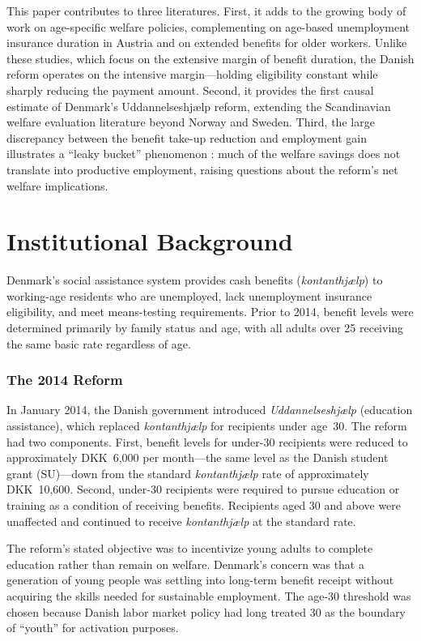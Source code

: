 \documentclass[12pt]{article}
\begin{document}
This paper contributes to three literatures. First, it adds to the growing body of work on age-specific welfare policies, complementing \citet{card2007a} on age-based unemployment insurance duration in Austria and \citet{lalive2006} on extended benefits for older workers. Unlike these studies, which focus on the extensive margin of benefit duration, the Danish reform operates on the intensive margin---holding eligibility constant while sharply reducing the payment amount. Second, it provides the first causal estimate of Denmark's Uddannelseshjælp reform, extending the Scandinavian welfare evaluation literature beyond Norway and Sweden. Third, the large discrepancy between the benefit take-up reduction and employment gain illustrates a ``leaky bucket'' phenomenon \citep{okun1975}: much of the welfare savings does not translate into productive employment, raising questions about the reform's net welfare implications.

\section{Institutional Background}

Denmark's social assistance system provides cash benefits (\textit{kontanthjælp}) to working-age residents who are unemployed, lack unemployment insurance eligibility, and meet means-testing requirements. Prior to 2014, benefit levels were determined primarily by family status and age, with all adults over 25 receiving the same basic rate regardless of age.

\subsubsection*{The 2014 Reform} In January 2014, the Danish government introduced \textit{Uddannelseshjælp} (education assistance), which replaced \textit{kontanthjælp} for recipients under age~30. The reform had two components. First, benefit levels for under-30 recipients were reduced to approximately DKK~6,000 per month---the same level as the Danish student grant (SU)---down from the standard \textit{kontanthjælp} rate of approximately DKK~10,600. Second, under-30 recipients were required to pursue education or training as a condition of receiving benefits. Recipients aged 30 and above were unaffected and continued to receive \textit{kontanthjælp} at the standard rate.

The reform's stated objective was to incentivize young adults to complete education rather than remain on welfare. Denmark's concern was that a generation of young people was settling into long-term benefit receipt without acquiring the skills needed for sustainable employment. The age-30 threshold was chosen because Danish labor market policy had long treated 30 as the boundary of ``youth'' for activation purposes.
\end{document}
